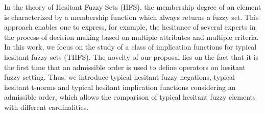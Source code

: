 
In the theory of Hesitant Fuzzy Sets (HFS), the membership degree of an element is characterized by a membership function which always returns a fuzzy set. This approach enables one to express, for example, the hesitance of several experts in the process of decision making based on multiple attributes and multiple criteria. In this work, we focus on the study of a class of implication functions for typical hesitant fuzzy sets (THFS). The novelty of our proposal lies on the fact that it is the first time that an admissible order is used to define operators on hesitant fuzzy setting. Thus, we introduce  typical hesitant fuzzy negations, typical hesitant t-norms and  typical hesitant implication functions considering an admissible order, which allows the comparison of typical hesitant fuzzy elements with different cardinalities.



